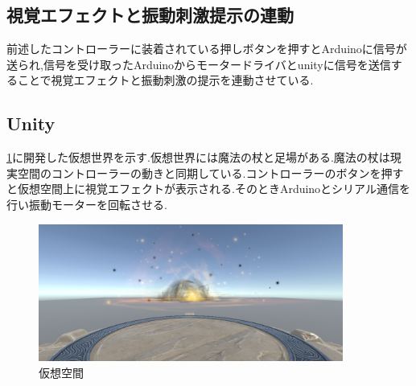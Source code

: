 \subsection{視覚エフェクトと振動刺激提示の連動}
前述したコントローラーに装着されている押しボタンを押すとArduinoに信号が送られ,信号を受け取ったArduinoからモータードライバとunityに信号を送信することで視覚エフェクトと振動刺激の提示を連動させている.

\subsection{Unity}
\ref{virtualworld}に開発した仮想世界を示す.仮想世界には魔法の杖と足場がある.魔法の杖は現実空間のコントローラーの動きと同期している.コントローラーのボタンを押すと仮想空間上に視覚エフェクトが表示される.そのときArduinoとシリアル通信を行い振動モーターを回転させる.

\begin{figure}[h]
\centering
\includegraphics[clip,width=10cm]{fig/unity.png}
\caption{仮想空間}\label{virtualworld}
\end{figure}

